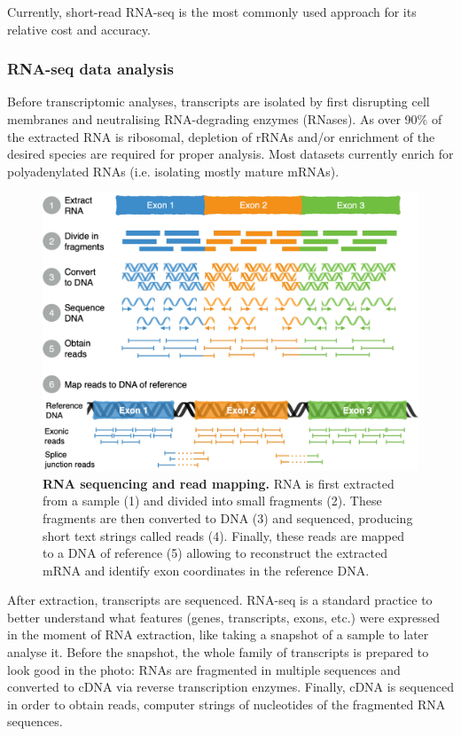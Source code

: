 Currently, short-read RNA-seq is the most commonly used approach for its relative cost and accuracy.

\subsubsection{RNA-seq data analysis}

Before transcriptomic analyses, transcripts are isolated by first disrupting cell membranes and neutralising RNA-degrading enzymes (RNases). As over 90\% of the extracted RNA is ribosomal, depletion of rRNAs and/or enrichment of the desired species are required for proper analysis. Most datasets currently enrich for polyadenylated RNAs (i.e. isolating mostly mature mRNAs).

\begin{figure}[!hb]
  \centering
  \includegraphics[width=1\linewidth]{images/intro/rna-seq}
  \caption[RNA sequencing and read mapping]{\textbf{RNA sequencing and read mapping.} RNA is first extracted from a sample (1) and divided into small fragments (2). These fragments are then converted to DNA (3) and sequenced, producing short text strings called reads (4). Finally, these reads are mapped to a DNA of reference (5) allowing to reconstruct the extracted mRNA and identify exon coordinates in the reference DNA.}
  \label{fig:RNAseq}
\end{figure}


After extraction, transcripts are sequenced. RNA-seq is a standard practice to better understand what features (genes, transcripts, exons, etc.) were expressed in the moment of RNA extraction, like taking a snapshot of a sample to later analyse it. Before the snapshot, the whole family of transcripts is prepared to look good in the photo: RNAs are fragmented in multiple sequences and converted to cDNA via reverse transcription enzymes. Finally, cDNA is sequenced in order to obtain reads, computer strings of nucleotides of the fragmented RNA sequences.

